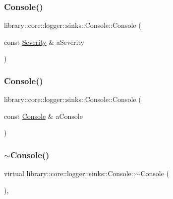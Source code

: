 \subsubsection{\texorpdfstring{Console()}{Console()}\hspace{0.1cm}{\footnotesize\ttfamily [1/2]}}
{\footnotesize\ttfamily library\+::core\+::logger\+::sinks\+::\+Console\+::\+Console (\begin{DoxyParamCaption}\item[{const \hyperlink{namespacelibrary_1_1core_1_1logger_a35f71353edf64f68f7fe3874b01abaa8}{Severity} \&}]{a\+Severity }\end{DoxyParamCaption})}

\mbox{\label{classlibrary_1_1core_1_1logger_1_1sinks_1_1Console_a6d7feabeb113b6448d0b83d114175328}} 
\subsubsection{\texorpdfstring{Console()}{Console()}\hspace{0.1cm}{\footnotesize\ttfamily [2/2]}}
{\footnotesize\ttfamily library\+::core\+::logger\+::sinks\+::\+Console\+::\+Console (\begin{DoxyParamCaption}\item[{const \hyperlink{classlibrary_1_1core_1_1logger_1_1sinks_1_1Console}{Console} \&}]{a\+Console }\end{DoxyParamCaption})}

\mbox{\label{classlibrary_1_1core_1_1logger_1_1sinks_1_1Console_adefb4276dd98ae3d6183b4c2351f88b6}} 
\subsubsection{\texorpdfstring{$\sim$\+Console()}{~Console()}}
{\footnotesize\ttfamily virtual library\+::core\+::logger\+::sinks\+::\+Console\+::$\sim$\+Console (\begin{DoxyParamCaption}{ }\end{DoxyParamCaption})\hspace{0.3cm}{\ttfamily [override]}, {\ttfamily [virtual]}}



